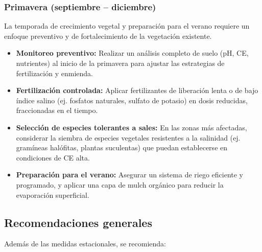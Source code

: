 \documentclass[fleqn]{jaes}
\begin{document}
\subsubsection{Primavera (septiembre -- diciembre)}

La temporada de crecimiento vegetal y preparación para el verano requiere un enfoque preventivo y de fortalecimiento de la vegetación existente.

\begin{itemize}
  \item \textbf{Monitoreo preventivo:} Realizar un análisis completo de suelo (pH, CE, nutrientes) al inicio de la primavera para ajustar las estrategias de fertilización y enmienda.
  \item \textbf{Fertilización controlada:} Aplicar fertilizantes de liberación lenta o de bajo índice salino (ej. fosfatos naturales, sulfato de potasio) en dosis reducidas, fraccionadas en el tiempo.
  \item \textbf{Selección de especies tolerantes a sales:} En las zonas más afectadas, considerar la siembra de especies vegetales resistentes a la salinidad (ej. gramíneas halófitas, plantas suculentas) que puedan establecerse en condiciones de CE alta.
  \item \textbf{Preparación para el verano:} Asegurar un sistema de riego eficiente y programado, y aplicar una capa de mulch orgánico para reducir la evaporación superficial.
\end{itemize}

\subsection{Recomendaciones generales}

Además de las medidas estacionales, se recomienda:
\end{document}
